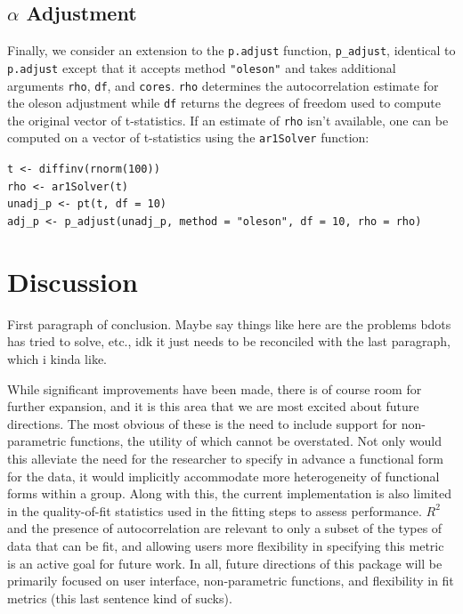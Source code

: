 \documentclass{article}
\begin{document}
\subsection{$\alpha$ Adjustment}

Finally, we consider an extension to the \texttt{p.adjust} function, \texttt{p\_adjust}, identical to \texttt{p.adjust} except that it accepts method \texttt{"oleson"} and takes additional arguments \texttt{rho}, \texttt{df}, and \texttt{cores}. \texttt{rho} determines the autocorrelation estimate for the oleson adjustment while \texttt{df} returns the degrees of freedom used to compute the original vector of t-statistics. If an estimate of \texttt{rho} isn't available, one can be computed on a vector of t-statistics using the \texttt{ar1Solver} function:

\begin{center}
\texttt{t <- diffinv(rnorm(100))} \\
\texttt{rho <- ar1Solver(t)} \\
\texttt{unadj\_p <- pt(t, df = 10)} \\
\texttt{adj\_p <- p\_adjust(unadj\_p, method = "oleson", df = 10, rho = rho)}
\end{center}




\section{Discussion}

First paragraph of conclusion. Maybe say things like here are the problems bdots has tried to solve, etc., idk it just needs to be reconciled with the last paragraph, which i kinda like.

While significant improvements have been made, there is of course room for further expansion, and it is this area that we are most excited about future directions. The most obvious of these is the need to include support for non-parametric functions, the utility of which cannot be overstated. Not only would this alleviate the need for the researcher to specify in advance a functional form for the data, it would implicitly accommodate more heterogeneity of functional forms within a group. Along with this, the current implementation is also limited in the quality-of-fit statistics used in the fitting steps to assess performance. $R^2$ and the presence of autocorrelation are relevant to only a subset of the types of data that can be fit, and allowing users more flexibility in specifying this metric is an active goal for future work. In all, future directions of this package will be primarily focused on user interface, non-parametric functions, and flexibility in fit metrics (this last sentence kind of sucks).
\end{document}

